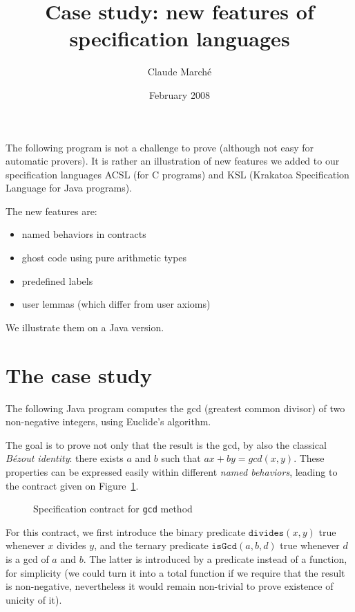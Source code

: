\documentclass[a4paper,12pt]{article}
\begin{document}
\sloppy

\title{Case study: new features of specification languages}
\author{Claude March\'e}
\date{February 2008}
\maketitle

\thispagestyle{empty}



The following program is not a challenge to prove (although not easy
for automatic provers). It is rather an illustration of new features
we added to our specification languages ACSL (for C programs) and KSL
(Krakatoa Specification Language for Java programs).

The new features are:
\begin{itemize}
\item named behaviors in contracts
\item ghost code using pure arithmetic types
\item predefined labels
\item user lemmas (which differ from user axioms) 
\end{itemize}

We illustrate them on a Java version.

\section{The case study}

The following Java program computes the gcd (greatest common divisor)
of two non-negative integers, using Euclide's algorithm.


The goal is to prove not only that the result is the gcd, by also the
classical \emph{B\'ezout identity}: there exists $a$ and $b$ such that
$ax+by=gcd(x,y)$. These properties can be expressed easily within
different \emph{named behaviors}, leading to the contract given on
Figure~\ref{fig:spec}.

\begin{figure}[t]
  
  \caption{Specification contract for \texttt{gcd} method}
\label{fig:spec}
\hrulefill
\end{figure}

For this contract, we first introduce the binary predicate
$\texttt{divides}(x,y)$ true whenever $x$ divides $y$, and the ternary
predicate $\texttt{isGcd}(a,b,d)$ true whenever $d$ is a gcd of $a$
and $b$. The latter is introduced by a predicate instead of a
function, for simplicity (we could turn it into a total function if we
require that the result is non-negative, nevertheless it would remain
non-trivial to prove existence of unicity of it).
\end{document}
